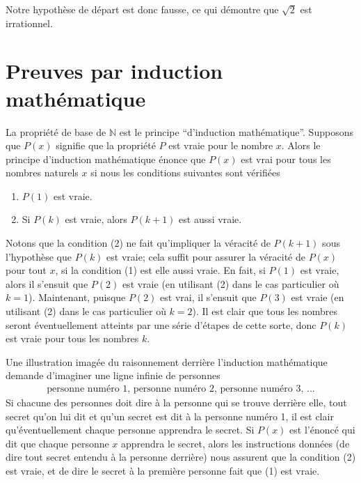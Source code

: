\documentclass[]{book}
\providecommand{\tightlist}{%
  \setlength{\itemsep}{0pt}\setlength{\parskip}{0pt}}
\theoremstyle{definition}
\theoremstyle{definition}
\theoremstyle{definition}
\theoremstyle{remark}
\begin{document}
Notre hypothèse de départ est donc fausse, ce qui démontre que \(\sqrt{2}\) est irrationnel.

\hypertarget{preuves-par-induction-mathuxe9matique}{%
\section{Preuves par induction mathématique}\label{preuves-par-induction-mathuxe9matique}}

La propriété de base de \(\mathbb{N}\) est le principe ``d'induction mathématique''. Supposons que \(P(x)\) signifie que la propriété \(P\) est vraie pour le nombre \(x\). Alors le principe d'induction mathématique énonce que \(P(x)\) est vrai pour tous les nombres naturels \(x\) si nous les conditions suivantes sont vérifiées

\begin{enumerate}
\def\labelenumi{\arabic{enumi}.}
\tightlist
\item
  \(P(1)\) est vraie.
\item
  Si \(P(k)\) est vraie, alors \(P(k+1)\) est aussi vraie.
\end{enumerate}

Notons que la condition (2) ne fait qu'impliquer la véracité de \(P(k+1)\) sous l'hypothèse que \(P(k)\) est vraie; cela suffit pour assurer la véracité de \(P(x)\) pour tout \(x\), si la condition (1) est elle aussi vraie. En fait, si \(P(1)\) est vraie, alors il s'ensuit que \(P(2)\) est vraie (en utilisant (2) dans le cas particulier où \(k=1\)). Maintenant, puisque \(P(2)\) est vrai, il s'ensuit que \(P(3)\) est vraie (en utilisant (2) dans le cas particulier où \(k=2\)). Il est clair que tous les nombres seront éventuellement atteints par une série d'étapes de cette sorte, donc \(P(k)\) est vraie pour tous les nombres \(k\).

Une illustration imagée du raisonnement derrière l'induction mathématique demande d'imaginer une ligne infinie de personnes
\begin{align*}
        \text{personne numéro 1, personne numéro 2, personne numéro 3, ...}
    \end{align*}
Si chacune des personnes doit dire à la personne qui se trouve derrière elle, tout secret qu'on lui dit et qu'un secret est dit à la personne numéro 1, il est clair qu'éventuellement chaque personne apprendra le secret. Si \(P(x)\) est l'énoncé qui dit que chaque personne \(x\) apprendra le secret, alors les instructions données (de dire tout secret entendu à la personne derrière) nous assurent que la condition (2) est vraie, et de dire le secret à la première personne fait que (1) est vraie.
\end{document}

